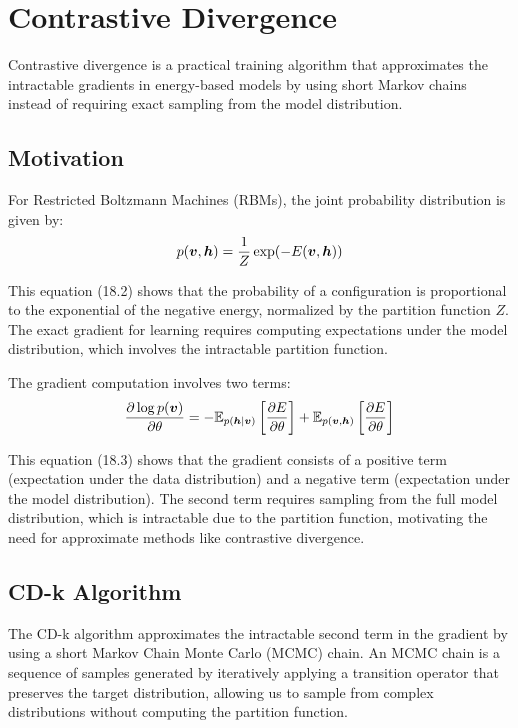 
\section{Contrastive Divergence }
\label{sec:contrastive-divergence}

Contrastive divergence is a practical training algorithm that approximates the intractable gradients in energy-based models by using short Markov chains instead of requiring exact sampling from the model distribution.

\subsection{Motivation}

For Restricted Boltzmann Machines (RBMs), the joint probability distribution is given by:
\begin{equation}
p(\boldsymbol{v}, \boldsymbol{h}) = \frac{1}{Z} \exp(-E(\boldsymbol{v}, \boldsymbol{h}))
\end{equation}

This equation (18.2) shows that the probability of a configuration is proportional to the exponential of the negative energy, normalized by the partition function $Z$. The exact gradient for learning requires computing expectations under the model distribution, which involves the intractable partition function.

The gradient computation involves two terms:
\begin{equation}
\frac{\partial \log p(\boldsymbol{v})}{\partial \theta} = -\mathbb{E}_{p(\boldsymbol{h}|\boldsymbol{v})}\left[\frac{\partial E}{\partial \theta}\right] + \mathbb{E}_{p(\boldsymbol{v}, \boldsymbol{h})}\left[\frac{\partial E}{\partial \theta}\right]
\end{equation}

This equation (18.3) shows that the gradient consists of a positive term (expectation under the data distribution) and a negative term (expectation under the model distribution). The second term requires sampling from the full model distribution, which is intractable due to the partition function, motivating the need for approximate methods like contrastive divergence.

\subsection{CD-k Algorithm}

The CD-k algorithm approximates the intractable second term in the gradient by using a short Markov Chain Monte Carlo (MCMC) chain. An MCMC chain is a sequence of samples generated by iteratively applying a transition operator that preserves the target distribution, allowing us to sample from complex distributions without computing the partition function.

